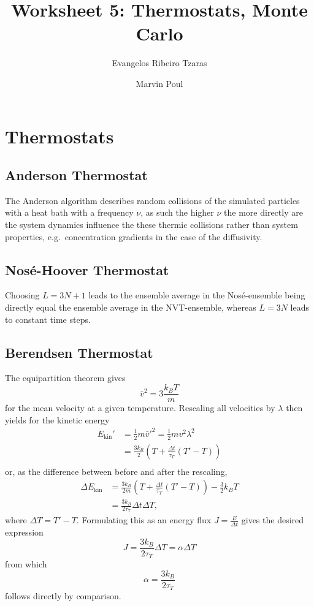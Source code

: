 \documentclass[a4paper,11pt,bibtotoc]{scrartcl}
\title{Worksheet 5: Thermostats, Monte Carlo}
\author{Evangelos Ribeiro Tzaras \and Marvin Poul}
\begin{document}
\maketitle

\section{Thermostats}

\subsection{Anderson Thermostat}

The Anderson algorithm describes random collisions of the simulated particles
with a heat bath with a frequency $\nu$, as such the higher $\nu$ the more
directly are the system dynamics influence the these thermic collisions rather
than system properties, e.g.\ concentration gradients in the case of the
diffusivity.

\subsection{Nos\' e-Hoover Thermostat}

Choosing $L = 3N + 1$ leads to the ensemble average in the Nos\' e-ensemble
being directly equal the ensemble average in the NVT-ensemble, whereas $L = 3N$
leads to constant time steps.

\subsection{Berendsen Thermostat}

The equipartition theorem gives
\begin{equation*}
    \bar v^2 = 3\frac{k_BT}{m}
\end{equation*}
for the mean velocity at a given temperature. Rescaling all velocities by
$\lambda$ then yields for the kinetic energy
\begin{align*}
    E_\mathrm{kin}' &= \frac{1}{2}m\bar v'^2 = \frac{1}{2}mv^2\lambda^2 \\
    &= \frac{3k_B }{2}\left(T + \frac{\Delta t}{\tau_T}(T' - T)\right) \\
\end{align*}
or, as the difference between before and after the rescaling,
\begin{align*}
    ΔE_\mathrm{kin} &= \frac{3k_B }{2m}\left(T + \frac{\Delta t}{\tau_T}(T' -
    T)\right) - \frac{3}{2}k_BT \\
    &= \frac{3k_B}{2\tau_T}\Delta t\Delta T,
\end{align*}
where $\Delta T = T' - T$. Formulating this as an energy flux $J =
\frac{E}{\Delta t}$ gives the desired expression
\begin{equation*}
    J = \frac{3k_B}{2\tau_T}\Delta T = \alpha \Delta T
\end{equation*}
from which
\begin{equation*}
    \alpha = \frac{3k_B}{2\tau_T}
\end{equation*}
follows directly by comparison.
\end{document}
